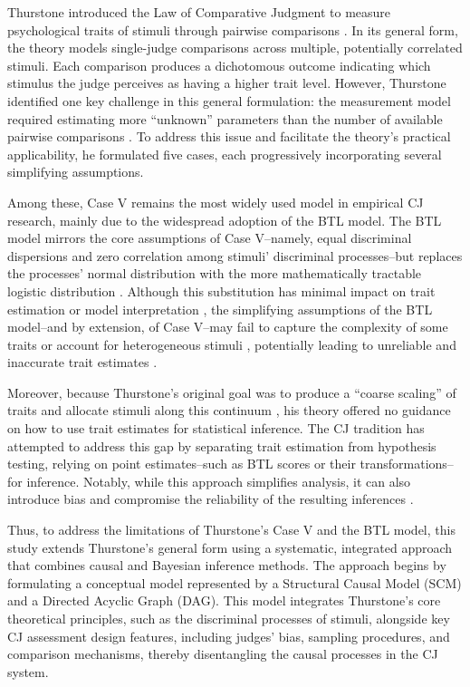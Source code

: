 \documentclass[
  authoryear,
  review,
  1p]{elsarticle}
\begin{document}
Thurstone introduced the Law of Comparative Judgment to measure
psychological traits of stimuli through pairwise comparisons
\citep{Thurstone_1927a, Thurstone_1927b}. In its general form, the
theory models single-judge comparisons across multiple, potentially
correlated stimuli. Each comparison produces a dichotomous outcome
indicating which stimulus the judge perceives as having a higher trait
level. However, Thurstone identified one key challenge in this general
formulation: the measurement model required estimating more ``unknown''
parameters than the number of available pairwise comparisons
\citep{Thurstone_1927b}. To address this issue and facilitate the
theory's practical applicability, he formulated five cases, each
progressively incorporating several simplifying assumptions.

Among these, Case V remains the most widely used model in empirical CJ
research, mainly due to the widespread adoption of the BTL model. The
BTL model mirrors the core assumptions of Case V--namely, equal
discriminal dispersions and zero correlation among stimuli' discriminal
processes--but replaces the processes' normal distribution with the more
mathematically tractable logistic distribution
\citep{Andrich_1978, Bramley_2008}. Although this substitution has
minimal impact on trait estimation or model interpretation
\citep{vanderLinden_et_al_2017_I, McElreath_2021}, the simplifying
assumptions of the BTL model--and by extension, of Case V--may fail to
capture the complexity of some traits or account for heterogeneous
stimuli
\citep{Thurstone_1927a, Andrich_1978, Bramley_2008, Kelly_et_al_2022},
potentially leading to unreliable and inaccurate trait estimates
\citep{Ackerman_1989, Zimmerman_1994, McElreath_2020, Hoyle_et_al_2023}.

Moreover, because Thurstone's original goal was to produce a ``coarse
scaling'' of traits and allocate stimuli along this continuum
\citep[pp.~269]{Thurstone_1927a}, his theory offered no guidance on how
to use trait estimates for statistical inference. The CJ tradition has
attempted to address this gap by separating trait estimation from
hypothesis testing, relying on point estimates--such as BTL scores or
their transformations--for inference. Notably, while this approach
simplifies analysis, it can also introduce bias and compromise the
reliability of the resulting inferences
\citep{McElreath_2020, Kline_et_al_2023, Hoyle_et_al_2023}.

Thus, to address the limitations of Thurstone's Case V and the BTL
model, this study extends Thurstone's general form using a systematic,
integrated approach that combines causal and Bayesian inference methods.
The approach begins by formulating a conceptual model represented by a
Structural Causal Model (SCM) and a Directed Acyclic Graph (DAG). This
model integrates Thurstone's core theoretical principles, such as the
discriminal processes of stimuli, alongside key CJ assessment design
features, including judges' bias, sampling procedures, and comparison
mechanisms, thereby disentangling the causal processes in the CJ system.
\end{document}
